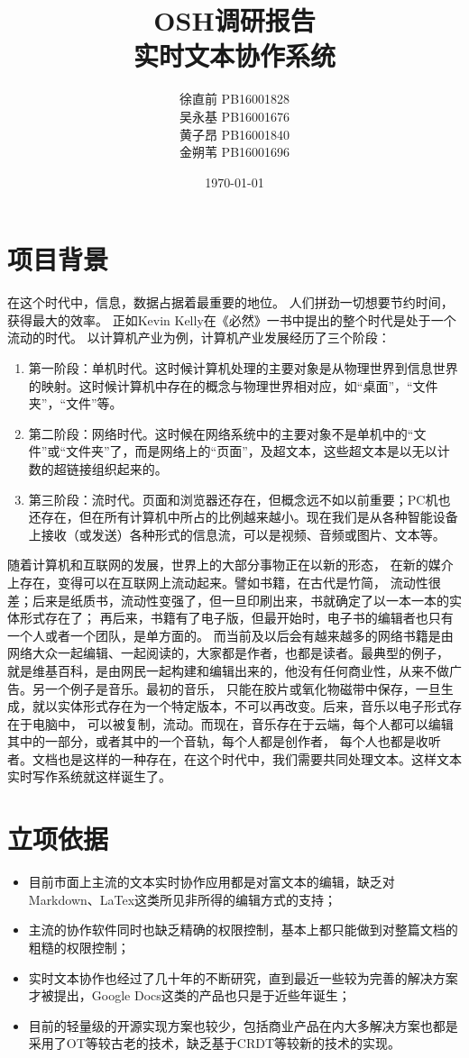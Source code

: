 \documentclass[11pt]{ctexart}
\title{OSH调研报告\\[2ex]实时文本协作系统}
\author{徐直前 PB16001828\\吴永基 PB16001676\\黄子昂 PB16001840\\金朔苇 PB16001696\\}
\date{\today}
\begin{document}
\maketitle
\tableofcontents

\section{项目背景}
在这个时代中，信息，数据占据着最重要的地位。
人们拼劲一切想要节约时间，获得最大的效率。
正如Kevin Kelly在《必然》一书中提出的整个时代是处于一个流动的时代。
以计算机产业为例，计算机产业发展经历了三个阶段：
\begin{enumerate}
    \item 第一阶段：单机时代。这时候计算机处理的主要对象是从物理世界到信息世界的映射。这时候计算机中存在的概念与物理世界相对应，如“桌面”，“文件夹”，“文件”等。
    \item 第二阶段：网络时代。这时候在网络系统中的主要对象不是单机中的“文件”或“文件夹”了，而是网络上的“页面”，及超文本，这些超文本是以无以计数的超链接组织起来的。
    \item 第三阶段：流时代。页面和浏览器还存在，但概念远不如以前重要；PC机也还存在，但在所有计算机中所占的比例越来越小。现在我们是从各种智能设备上接收（或发送）各种形式的信息流，可以是视频、音频或图片、文本等。
\end{enumerate}
随着计算机和互联网的发展，世界上的大部分事物正在以新的形态，
在新的媒介上存在，变得可以在互联网上流动起来。譬如书籍，在古代是竹简，
流动性很差；后来是纸质书，流动性变强了，但一旦印刷出来，书就确定了以一本一本的实体形式存在了；
再后来，书籍有了电子版，但最开始时，电子书的编辑者也只有一个人或者一个团队，是单方面的。
而当前及以后会有越来越多的网络书籍是由网络大众一起编辑、一起阅读的，大家都是作者，也都是读者。最典型的例子，
就是维基百科，是由网民一起构建和编辑出来的，他没有任何商业性，从来不做广告。另一个例子是音乐。最初的音乐，
只能在胶片或氧化物磁带中保存，一旦生成，就以实体形式存在为一个特定版本，不可以再改变。后来，音乐以电子形式存在于电脑中，
可以被复制，流动。而现在，音乐存在于云端，每个人都可以编辑其中的一部分，或者其中的一个音轨，每个人都是创作者，
每个人也都是收听者。文档也是这样的一种存在，在这个时代中，我们需要共同处理文本。这样文本实时写作系统就这样诞生了。

\section{立项依据}
\begin{itemize}
    \item 目前市面上主流的文本实时协作应用都是对富文本的编辑，缺乏对Markdown、LaTex这类所见非所得的编辑方式的支持；
    \item 主流的协作软件同时也缺乏精确的权限控制，基本上都只能做到对整篇文档的粗糙的权限控制；
    \item 实时文本协作也经过了几十年的不断研究，直到最近一些较为完善的解决方案才被提出，Google Docs这类的产品也只是于近些年诞生；
    \item 目前的轻量级的开源实现方案也较少，包括商业产品在内大多解决方案也都是采用了OT等较古老的技术，缺乏基于CRDT等较新的技术的实现。
\end{itemize}
\end{document}
